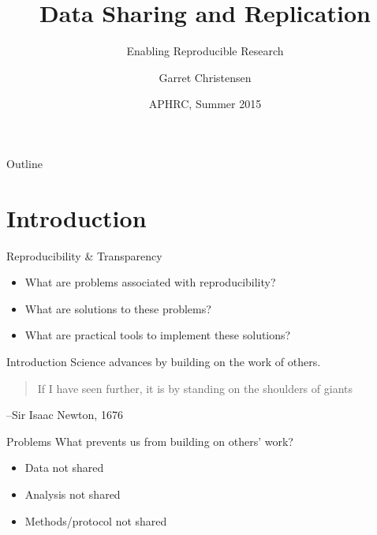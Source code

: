 \documentclass{beamer}
\title[Data Sharing and Replication] %
{Data Sharing and Replication}
\subtitle
{Enabling Reproducible Research} %
\author[Christensen] %
{Garret Christensen\inst{1}}
\institute[UC Berkeley, Berkeley Initiative for Transparency in the Social Sciences] %
{
  \inst{1}%
  UC Berkeley: Berkeley Initiative for Transparency in the Social Sciences\\
  Berkeley Institute for Data Science
}
\date[Short Occasion] %
{APHRC, Summer 2015}
\begin{document}


\begin{frame}
  \titlepage
\end{frame}

\begin{frame}{Outline}
  \tableofcontents
\end{frame}


\section{Introduction}
\begin{frame}{Reproducibility \& Transparency}
\begin{itemize}
\item What are problems associated with reproducibility?
\item What are solutions to these problems?
\item What are practical tools to implement these solutions?
\end{itemize}
\end{frame}
\begin{frame}{Introduction}
Science advances by building on the work of others. 
\vspace{0.5in}


\begin{quote}
If I have seen further, it is by standing on the shoulders of giants
\end{quote}
\begin{flushright}
--Sir Isaac Newton, 1676
\end{flushright}
\end{frame}

\begin{frame}{Problems}
What prevents us from building on others' work?
\begin{itemize}[<.->]
 \item Data not shared
 \item Analysis not shared
 \item Methods/protocol not shared 
\end{itemize}
\end{frame}
\end{document}
